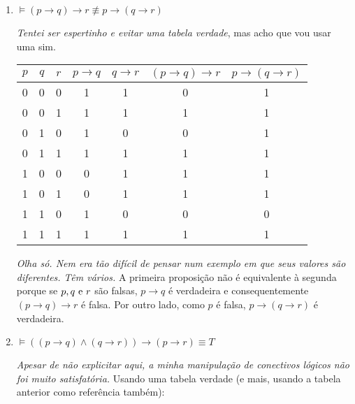 \documentclass[12pt]{article}
\begin{document}
\begin{enumerate}
    \item \( \models (p \to q) \to r \not\equiv  p \to (q \to r)\) 

        \textit{Tentei ser espertinho e evitar uma tabela verdade}, mas acho que vou usar uma sim.

        \begin{center}
            \begin{tabular}{||c c c || c c c c ||} 
                \hline
                \( p \)  & \( q \) & \( r \) & \( p \to q  \) & \( q \to  r \) & \( (p \to q) \to r \) & \( p \to (q \to r)\)  \\ [0.5ex]
                \hline\hline
                0 & 0 & 0 & 1 & 1 & 0 & 1 \\ 
                \hline
                0 & 0 & 1 & 1 & 1 & 1 & 1 \\
                \hline
                0 & 1 & 0 & 1 & 0 & 0 & 1 \\
                \hline
                0 & 1 & 1 & 1 & 1 & 1 & 1 \\
                \hline
                1 & 0 & 0 & 0 & 1 & 1 & 1 \\ 
                \hline
                1 & 0 & 1 & 0 & 1 & 1 & 1 \\
                \hline
                1 & 1 & 0 & 1 & 0 & 0 & 0 \\
                \hline
                1 & 1 & 1 & 1 & 1 & 1 & 1 \\ [1ex]
                \hline
            \end{tabular}
        \end{center}

        \textit{Olha só. Nem era tão difícil de pensar num exemplo em que seus valores são diferentes. Têm vários.} A primeira proposição não é equivalente à segunda porque se \( p, q \textnormal{ e } r \) são falsas, \( p \to q \) é verdadeira e consequentemente \( (p \to q) \to r \) é falsa. Por outro lado, como \( p \) é falsa, \( p \to (q \to r) \) é verdadeira.

    \item \( \models ((p \to q) \land (q \to r)) \to (p \to r) \equiv T \) 

        \textit{Apesar de não explicitar aqui, a minha manipulação de conectivos lógicos não foi muito satisfatória.} Usando uma tabela verdade (e mais, usando a tabela anterior como referência também):


\end{enumerate}
\end{document}
